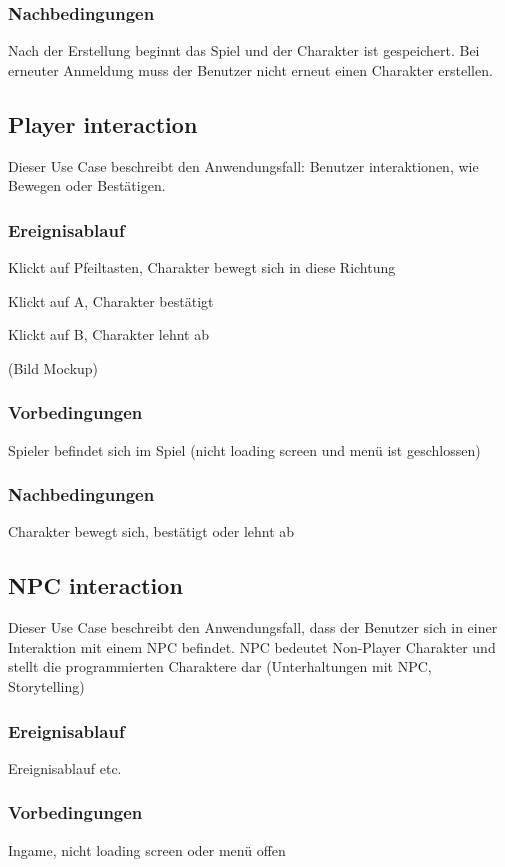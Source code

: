 		\subsubsection{Nachbedingungen}
			Nach der Erstellung beginnt das Spiel und der Charakter ist gespeichert. Bei erneuter Anmeldung muss der Benutzer nicht erneut einen Charakter erstellen.
	
	\subsection{Player interaction}
		Dieser Use Case beschreibt den Anwendungsfall: Benutzer interaktionen, wie Bewegen oder Bestätigen.
			
		\subsubsection{Ereignisablauf}
			Klickt auf Pfeiltasten, Charakter bewegt sich in diese Richtung
			
			Klickt auf A, Charakter bestätigt
			
			Klickt auf B, Charakter lehnt ab
			
			(Bild Mockup)
			
		\subsubsection{Vorbedingungen}
			Spieler befindet sich im Spiel (nicht loading screen und menü ist geschlossen)
			
		\subsubsection{Nachbedingungen}
			Charakter bewegt sich, bestätigt oder lehnt ab
	
	\subsection{NPC interaction}
		Dieser Use Case beschreibt den Anwendungsfall, dass der Benutzer sich in einer Interaktion mit einem NPC befindet. NPC bedeutet Non-Player Charakter und stellt die programmierten Charaktere dar (Unterhaltungen mit NPC, Storytelling)
			
		\subsubsection{Ereignisablauf}
			Ereignisablauf etc.

		\subsubsection{Vorbedingungen}
			Ingame, nicht loading screen oder menü offen
			
